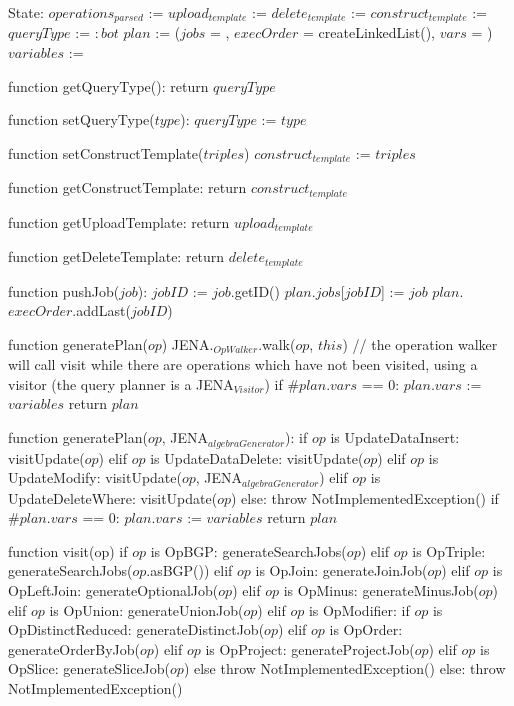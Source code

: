 State:
    $operations_{parsed}$ := {}
    $upload_{template}$ := {}
    $delete_{template}$ := {}
    $construct_{template}$ := {}
    $queryType$ := $:bot$
    $plan$ := ($jobs$ = {}, $execOrder$ = createLinkedList(), $vars$ = {})
    $variables$ := {}

function getQueryType():
    return $queryType$

function setQueryType($type$):
    $queryType$ := $type$

function setConstructTemplate($triples$) 
    $construct_{template}$ := $triples$

function getConstructTemplate: 
    return $construct_{template}$

function getUploadTemplate:
    return $upload_{template}$

function getDeleteTemplate:
    return $delete_{template}$

function pushJob($job$):
    $jobID$ := $job$.getID()
    $plan$.$jobs$[$jobID$] := $job$
    $plan$.$execOrder$.addLast($jobID$)

function generatePlan($op$) 
    JENA.$_{OpWalker}$.walk($op$, $this$) // the operation walker will call visit while there are operations which have not been visited, using a visitor (the query planner is a JENA$_{Visitor}$)
    if $\#plan.vars$ == 0:
        $plan.vars$ := $variables$
    return $plan$

function generatePlan($op$, JENA$_{algebraGenerator}$):
    if $op$ is UpdateDataInsert:
        visitUpdate($op$)
    elif $op$ is UpdateDataDelete: 
        visitUpdate($op$)
    elif $op$ is UpdateModify:
        visitUpdate($op$, JENA$_{algebraGenerator}$)
    elif $op$ is UpdateDeleteWhere:
        visitUpdate($op$)
    else: 
        throw NotImplementedException()
    if $\#plan.vars$ == 0:
        $plan.vars$ := $variables$
    return $plan$

function visit(op) 
    if $op$ is OpBGP:
        generateSearchJobs($op$)
    elif $op$ is OpTriple:
        generateSearchJobs($op$.asBGP())
    elif $op$ is OpJoin:
        generateJoinJob($op$)
    elif $op$ is OpLeftJoin: 
        generateOptionalJob($op$)
    elif $op$ is OpMinus:
        generateMinusJob($op$)
    elif $op$ is OpUnion: 
        generateUnionJob($op$)
    elif $op$ is OpModifier:
        if $op$ is OpDistinctReduced: 
            generateDistinctJob($op$)
        elif $op$ is OpOrder: 
            generateOrderByJob($op$)
        elif $op$ is OpProject: 
            generateProjectJob($op$)
        elif $op$ is OpSlice: 
            generateSliceJob($op$)
        else 
            throw NotImplementedException()
    else:
        throw NotImplementedException()

